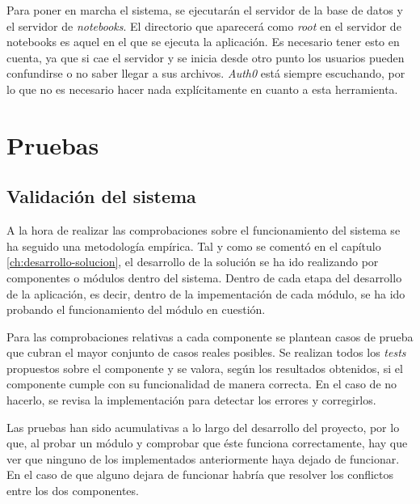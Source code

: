 \documentclass[11pt,spanish,listoffigures]{tfgetsinf}
\begin{document}
Para poner en marcha el sistema, se ejecutarán el servidor de la base de datos y el servidor de \textit{notebooks}. El directorio que aparecerá como \textit{root} en el servidor de notebooks es aquel en el que se ejecuta la aplicación. Es necesario tener esto en cuenta, ya que si cae el servidor y se inicia desde otro punto los usuarios pueden confundirse o no saber llegar a sus archivos. \textit{Auth0} está siempre escuchando, por lo que no es necesario hacer nada explícitamente en cuanto a esta herramienta. 





\chapter{Pruebas}
\label{ch:pruebas}



\section{Validación del sistema}
\label{sec:validacion-sistema}

A la hora de realizar las comprobaciones sobre el funcionamiento del sistema se ha seguido una metodología empírica. Tal y como se comentó en el capítulo \ref{ch:desarrollo-solucion}, el desarrollo de la solución se ha ido realizando por componentes o módulos dentro del sistema. Dentro de cada etapa del desarrollo de la aplicación, es decir, dentro de la impementación de cada módulo, se ha ido probando el funcionamiento del módulo en cuestión.

Para las comprobaciones relativas a cada componente se plantean casos de prueba que cubran el mayor conjunto de casos reales posibles. Se realizan todos los \textit{tests} propuestos sobre el componente y se valora, según los resultados obtenidos, si el componente cumple con su funcionalidad de manera correcta. En el caso de no hacerlo, se revisa la implementación para detectar los errores y corregirlos.

Las pruebas han sido acumulativas a lo largo del desarrollo del proyecto, por lo que, al probar un módulo y comprobar que éste funciona correctamente, hay que ver que ninguno de los implementados anteriormente haya dejado de funcionar. En el caso de que alguno dejara de funcionar habría que resolver los conflictos entre los dos componentes.
\end{document}
